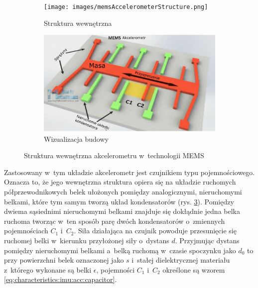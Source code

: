 \begin{figure}[!htp]
	\centering
	\begin{subfigure}[b]{0.49\textwidth}
		\centering
		\texttt{[image: images/memsAccelerometerStructure.png]}
		\caption{Struktura wewnętrzna \cite{memsAccStructure2016}}
		\label{fig:characteristics:imu:acc:memsA}
	\end{subfigure}	
	\begin{subfigure}[b]{0.49\textwidth}
		\centering
		\includegraphics[width=\linewidth]{images/memsAccelerometerIdea.png}
		\caption{Wizualizacja budowy \cite{memsAccIdea2016}}
		\label{fig:characteristics:imu:acc:memsB}
	\end{subfigure}	
													
	\caption{Struktura wewnętrzna akcelerometru w~technologii MEMS}
	\label{fig:characteristics:imu:acc:mems}
\end{figure}
		
Zastosowany w~tym układzie akcelerometr jest czujnikiem typu pojemnościowego. Oznacza to, że jego wewnętrzna struktura opiera się na układzie ruchomych półprzewodnikowych belek ułożonych pomiędzy analogicznymi, nieruchomymi belkami, które tym samym tworzą układ kondensatorów (rys. \ref{fig:characteristics:imu:acc:mems}). Pomiędzy dwiema sąsiednimi nieruchomymi belkami znajduje się dokłądnie jedna belka ruchoma tworząc w~ten sposób parę dwóch kondensatorów o~zmiennych pojemnościach $C_1$ i~$C_2$. Siła działająca na czujnik powoduje przesunięcie się ruchomej belki w~kierunku przyłożonej siły o~dystans $d$. Przyjmując dystans pomiędzy nieruchomymi belkami a~belką ruchomą w~czasie spoczynku jako $d_0$ to przy powierzchni belek oznaczonej jako $s$ i~stałej dielektrycznej materiału z~którego wykonane są belki $\epsilon$, pojemności $C_1$ i~$C_2$ określone są wzorem \eqref{eq:characteristics:imu:acc:capacitor}.
	
